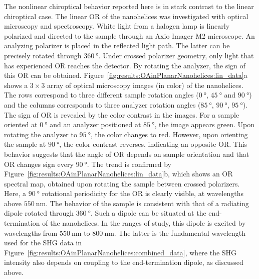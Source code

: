 The nonlinear chiroptical behavior reported here is in stark contrast to the linear chiroptical case. The linear OR of the nanohelices was investigated with optical microscopy and spectroscopy. White light from a halogen lamp is linearly polarized and directed to the sample through an Axio Imager M2 microscope. 
An analyzing polarizer is placed in the reflected light path. The latter can be precisely rotated through $\SI{360}{\degree}$. Under crossed polarizer geometry, only light that has experienced OR reaches the detector. By rotating the analyzer, the sign of this OR can be obtained. 
Figure~\ref{fig:results:OAinPlanarNanohelices:lin_data}a shows a $3 \times 3$ array of optical microscopy images (in color) of the nanohelices. The rows correspond to three different sample rotation angles ($\SI{0}{\degree}$, $\SI{45}{\degree}$ and $\SI{90}{\degree}$) and the columns corresponds to three analyzer rotation angles ($\SI{85}{\degree}$, $\SI{90}{\degree}$, $\SI{95}{\degree}$).
The sign of OR is revealed by the color contrast in the images. For a sample oriented at $\SI{0}{\degree}$ and an analyzer positioned at $\SI{85}{\degree}$, the image appears green.
Upon rotating the analyzer to $\SI{95}{\degree}$, the color changes to red. However, upon orienting the sample at $\SI{90}{\degree}$, the color contrast reverses, indicating an opposite OR. This behavior suggests that the angle of OR depends on sample orientation and that OR changes sign every $\SI{90}{\degree}$. 
The trend is confirmed by Figure~\ref{fig:results:OAinPlanarNanohelices:lin_data}b, which shows an OR spectral map, obtained upon rotating the sample between crossed polarizers. 
Here, a $\SI{90}{\degree}$ rotational periodicity for the OR is clearly visible, at wavelengths above $\SI{550}{\nano\m}$. The behavior of the sample is consistent with that of a radiating dipole rotated through $\SI{360}{\degree}$. Such a dipole can be situated at the end-termination of the nanohelices. In the ranges of study, this dipole is excited by wavelengths from $\SI{550}{\nano\m}$ to $\SI{800}{\nano\m}$. The latter is the fundamental wavelength used for the SHG data in Figure~\ref{fig:results:OAinPlanarNanohelices:combined_data}, where the SHG intensity also depends on coupling to the end-termination dipole, as discussed above.


